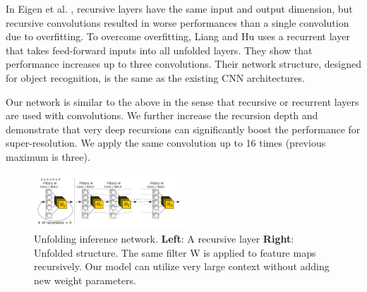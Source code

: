\documentclass[10pt,twocolumn,letterpaper]{article}
\begin{document}
In Eigen et al. \cite{Eigen2014}, recursive layers have the same input and output dimension, but recursive convolutions resulted in worse performances than a single convolution due to overfitting. To overcome overfitting, Liang and Hu \cite{Liang_2015_CVPR} uses a recurrent layer that takes feed-forward inputs into all unfolded layers. They show that performance increases up to three convolutions. Their network structure, designed for object recognition, is the same as the existing CNN architectures.

Our network is similar to the above in the sense that recursive or recurrent layers are used with convolutions. We further increase the recursion depth and demonstrate that very deep recursions can significantly boost the performance for super-resolution. We apply the same convolution up to 16 times (previous maximum is three). 

\begin{figure}[t]
	\includegraphics[width=0.5\textwidth]{figs/f2}
	\caption {Unfolding inference network. \textbf{Left}: A recursive layer \textbf{Right}: Unfolded structure. The same filter W is applied to feature maps recursively. Our model can utilize very large context without adding new weight parameters. }
	\label{fig:inference_network}
\end{figure}
\end{document}
